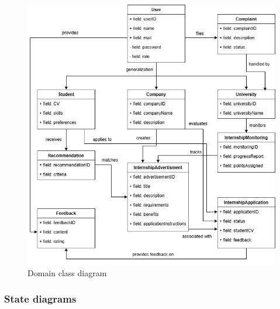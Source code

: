 \begin{figure}[H]
	\includegraphics[width=\textwidth,height=\textheight,keepaspectratio]{RASD-Latex/assets/UML - diagram.png}
	\caption{Domain class diagram}
	\label{fig:DataRequest}
\end{figure}





\subsubsection{State diagrams}

